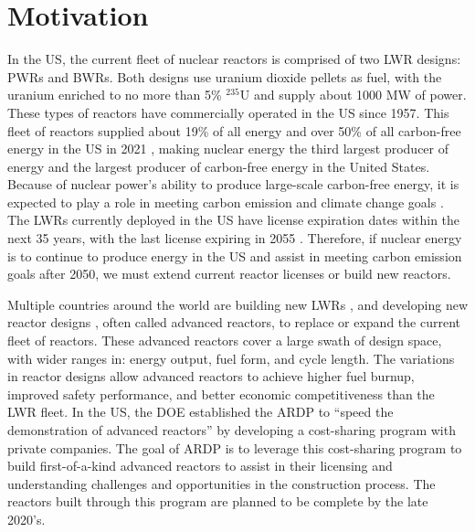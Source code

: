 \section{Motivation}
In the US, the current fleet of nuclear reactors is comprised 
of two \gls{LWR} designs: \glspl{PWR} and \glspl{BWR}. 
Both designs use uranium dioxide pellets as fuel, with the uranium 
enriched to no more than 5\% $^{235}$U and supply about 1000 MW of 
power. These types of reactors 
have commercially operated in the US since 1957. This fleet of 
reactors supplied about 19\% of all energy and over 50\%  
of all carbon-free energy in the US in 2021 
\cite{us_energy_information_administration_electricity_2022}, making nuclear 
energy the third largest producer of energy and the largest 
producer of carbon-free energy in the United States. Because of nuclear 
power's ability to produce large-scale carbon-free energy, it is 
expected to play a role in meeting carbon emission and climate change 
goals \cite{nea_meeting_2022}. The \glspl{LWR} 
currently deployed in the US have license expiration dates within 
the next 35 years, with the last license expiring in 2055 
\cite{nuclear_energy_institute_us_2021}. Therefore, if nuclear energy is 
to continue to produce energy in the US and assist in meeting carbon 
emission goals after 2050, we must extend current reactor licenses or 
build new reactors. 

Multiple countries around the world are building new \glspl{LWR}
\cite{world_nuclear_association_plans_2022}, and developing
new reactor designs \cite{hussain_advances_2018}, often called 
advanced reactors, to 
replace or expand the current fleet of reactors. These advanced reactors 
cover a large swath of design space, with wider ranges in: energy output, 
fuel form, and cycle length. The variations in reactor designs allow 
advanced reactors to achieve higher fuel burnup, improved safety 
performance, and better economic competitiveness than the \gls{LWR} fleet. 
In the US, the \gls{DOE} established the \gls{ARDP} 
\cite{us_department_of_energy_office_of_nuclear_energy_advanced_nodate}
to ``speed the demonstration of advanced reactors'' 
\cite{us_department_of_energy_office_of_nuclear_energy_advanced_nodate}
by developing a cost-sharing program with private companies. The goal of 
\gls{ARDP} is to leverage this cost-sharing program to build 
first-of-a-kind advanced reactors to assist in their licensing and 
understanding challenges and opportunities in the construction process. 
The reactors built through this program are planned to be complete by the 
late 2020's.

